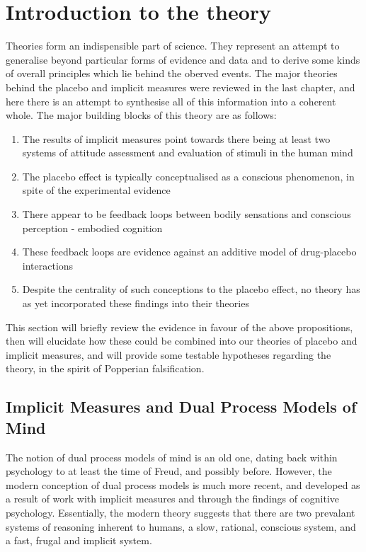 






\section{Introduction to the theory}

Theories form an indispensible part of science. They represent an attempt to generalise beyond particular forms of evidence and data and to derive some kinds of overall principles which lie behind the oberved events. The major theories behind the placebo and implicit measures were reviewed in the last chapter, and here there is an attempt to synthesise all of this information into a coherent whole. The major building blocks of this theory are as follows:
\begin{enumerate}
\item The results of implicit measures point towards there being at least two systems of attitude assessment and evaluation of stimuli in the human mind
\item The placebo effect is typically conceptualised as a conscious phenomenon, in spite of the experimental evidence
\item There appear to be feedback loops between bodily sensations and conscious perception - embodied cognition
\item These feedback loops are evidence against an additive model of drug-placebo interactions
\item Despite the centrality of such conceptions to the placebo effect, no theory has as yet incorporated these findings into their theories
\end{enumerate}

This section will briefly review the evidence in favour of the above propositions, then will elucidate how these could be combined into our theories of placebo and implicit measures, and will provide some testable hypotheses regarding the theory, in the spirit of Popperian falsification.

\subsection{Implicit Measures and Dual Process Models of Mind}

The notion of dual process models of mind is an old one, dating back within psychology to at least the time of Freud, and possibly before. However, the modern conception of dual process models is much more recent, and developed as a result of work with implicit measures and through the findings of cognitive psychology. Essentially, the modern theory suggests that there are two prevalant systems of reasoning inherent to humans, a slow, rational, conscious system, and a fast, frugal and implicit system. 

